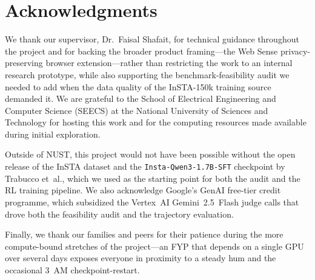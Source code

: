 \documentclass[12pt,a4paper]{report}
\begin{document}
\chapter*{Acknowledgments}

We thank our supervisor, Dr.~Faisal Shafait, for technical guidance throughout the project and for backing the broader product framing---the Web Sense privacy-preserving browser extension---rather than restricting the work to an internal research prototype, while also supporting the benchmark-feasibility audit we needed to add when the data quality of the InSTA-150k training source demanded it. We are grateful to the School of Electrical Engineering and Computer Science (SEECS) at the National University of Sciences and Technology for hosting this work and for the computing resources made available during initial exploration.

Outside of NUST, this project would not have been possible without the open release of the InSTA dataset and the \texttt{Insta-Qwen3-1.7B-SFT} checkpoint by Trabucco et~al., which we used as the starting point for both the audit and the RL training pipeline. We also acknowledge Google's GenAI free-tier credit programme, which subsidized the Vertex~AI Gemini~2.5~Flash judge calls that drove both the feasibility audit and the trajectory evaluation.

Finally, we thank our families and peers for their patience during the more compute-bound stretches of the project---an FYP that depends on a single GPU over several days exposes everyone in proximity to a steady hum and the occasional 3~AM checkpoint-restart.
\end{document}
